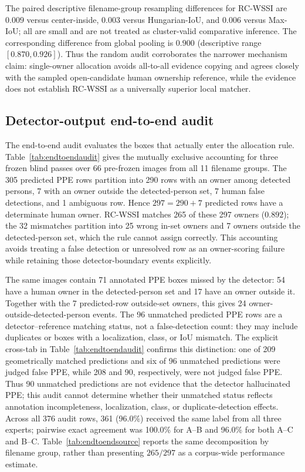 \documentclass[iicol,pdflatex,sn-mathphys-num]{sn-jnl}
\begin{document}
The paired descriptive filename-group resampling differences for RC-WSSI are $0.009$ versus center-inside, $0.003$ versus Hungarian-IoU, and $0.006$ versus Max-IoU; all are small and are not treated as cluster-valid comparative inference. The corresponding difference from global pooling is $0.900$ (descriptive range $[0.870,0.926]$). Thus the random audit corroborates the narrower mechanism claim: single-owner allocation avoids all-to-all evidence copying and agrees closely with the sampled open-candidate human ownership reference, while the evidence does not establish RC-WSSI as a universally superior local matcher.

\subsection{Detector-output end-to-end audit}
The end-to-end audit evaluates the boxes that actually enter the allocation rule. Table~\ref{tab:endtoendaudit} gives the mutually exclusive accounting for three frozen blind passes over 66 pre-frozen images from all 11 filename groups. The 305 predicted PPE rows partition into 290 rows with an owner among detected persons, 7 with an owner outside the detected-person set, 7 human false detections, and 1 ambiguous row. Hence $297=290+7$ predicted rows have a determinate human owner. RC-WSSI matches 265 of these 297 owners ($0.892$); the 32 mismatches partition into 25 wrong in-set owners and 7 owners outside the detected-person set, which the rule cannot assign correctly. This accounting avoids treating a false detection or unresolved row as an owner-scoring failure while retaining those detector-boundary events explicitly.

The same images contain 71 annotated PPE boxes missed by the detector: 54 have a human owner in the detected-person set and 17 have an owner outside it. Together with the 7 predicted-row outside-set owners, this gives 24 owner-outside-detected-person events. The 96 unmatched predicted PPE rows are a detector--reference matching status, not a false-detection count: they may include duplicates or boxes with a localization, class, or IoU mismatch. The explicit cross-tab in Table~\ref{tab:endtoendaudit} confirms this distinction: one of 209 geometrically matched predictions and six of 96 unmatched predictions were judged false PPE, while 208 and 90, respectively, were not judged false PPE. Thus 90 unmatched predictions are not evidence that the detector hallucinated PPE; this audit cannot determine whether their unmatched status reflects annotation incompleteness, localization, class, or duplicate-detection effects. Across all 376 audit rows, 361 (96.0\%) received the same label from all three experts; pairwise exact agreement was 100.0\% for A--B and 96.0\% for both A--C and B--C. Table~\ref{tab:endtoendsource} reports the same decomposition by filename group, rather than presenting $265/297$ as a corpus-wide performance estimate.
\end{document}
